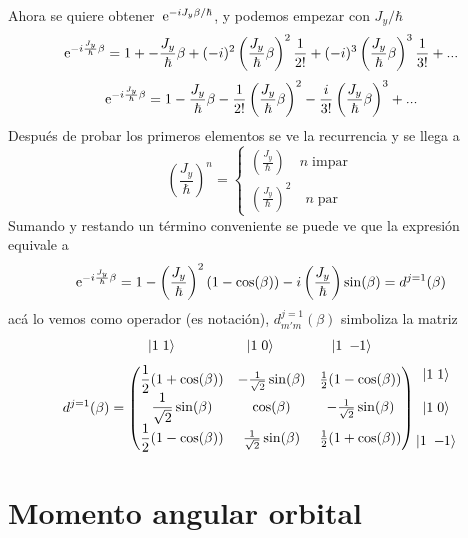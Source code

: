 \documentclass[10pt,oneside]{CBFT_book}
\begin{document}
Ahora se quiere obtener $\:\mathrm{e}^{-i J_y \beta/\hbar}$, y podemos empezar con $J_y/\hbar$
\[
	\:\mathrm{e}^{-i\frac{J_y}{\hbar}\beta} = 1 + -\frac{J_y}{\hbar}\beta + 
		(-i)^2\left(\frac{J_y}{\hbar}\beta\right)^2\frac{1}{2!} + 
		(-i)^3\left(\frac{J_y}{\hbar}\beta\right)^3\frac{1}{3!} + ...
\]
\[
	\:\mathrm{e}^{-i\frac{J_y}{\hbar}\beta} = 1 - \frac{J_y}{\hbar}\beta -
		\frac{1}{2!} \left(\frac{J_y}{\hbar}\beta\right)^2 -
		\frac{i}{3!}\left(\frac{J_y}{\hbar}\beta\right)^3 + ...
\]
Después de probar los primeros elementos se ve la recurrencia y se llega a 
\[
	\left( \frac{J_y}{\hbar} \right)^n = \begin{cases}
	                                      \left( \frac{J_y}{\hbar} \right) \quad n \; \text{impar} \\
	                                      \left( \frac{J_y}{\hbar} \right)^2 \quad n \; \text{par}
	                                     \end{cases}
\]
Sumando y restando un término conveniente se puede ve que la expresión equivale
a
\[
	\:\mathrm{e}^{-i\frac{J_y}{\hbar}\beta} = 1 -  \left( \frac{J_y}{\hbar} \right)^2 (1-\cos(\beta)) -
	i \left( \frac{J_y}{\hbar} \right) \sin(\beta)  = d^{j=1}(\beta)
\]
acá lo vemos como operador (es notación), $d_{m'm}^{j=1}(\beta)$ simboliza la matriz
\[
	\begin{matrix} \Ket{1\;1} \qquad\qquad\quad \Ket{1\;0} \qquad\qquad \Ket{1\;-\kern-1mm 1} \end{matrix}
\]
\[
	d^{j=1}(\beta) =
	\begin{pmatrix}
	\displaystyle \frac{1}{2}( 1 + \cos(\beta)) & -\frac{1}{\sqrt{2}}\sin(\beta) & \frac{1}{2}( 1 - 
\cos(\beta) ) \\
	\displaystyle{\frac{1}{\sqrt{2}}\sin(\beta)} & \cos(\beta) & -\frac{1}{\sqrt{2}}\sin(\beta) \\
	\displaystyle{\frac{1}{2}(1 - \cos(\beta))} & \frac{1}{\sqrt{2}}\sin(\beta) & \frac{1}{2}  ( 1 + 
\cos(\beta) )
	\end{pmatrix} \begin{matrix} \Ket{1\;1} \\ \\ \Ket{1\;0} \\ \\ \Ket{1\;-\kern-1mm 1} \end{matrix}
\]

\section{Momento angular orbital}
\end{document}
